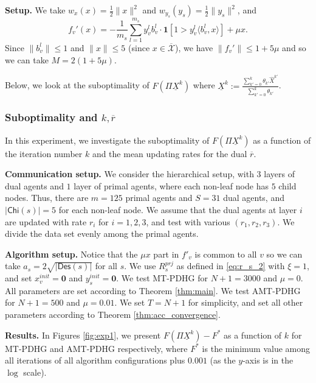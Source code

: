 \documentclass[10pt]{article}
\newcommand{\mc}{\mathcal}
\newcommand{\mb}{\mathbf}
\newcommand{\child}{\mathsf{Chi}}
\newcommand{\Descendant}{\mathsf{Des}}
\begin{document}
\textbf{Setup.} We take $w_x(x) = \frac{1}{2}\|x\|^2$ and $w_{y_s}(y_s) = \frac{1}{2}\|y_s\|^2$, and 
\begin{displaymath}
    f_v'(x) = -\frac{1}{m_s}\sum_{l=1}^{m_s} y_v^lb_v^l \cdot \mb 1[1>y_v^l\langle b_v^l,x\rangle] + \mu x.
\end{displaymath}
Since $\|b_v^l\|\leq 1$ and $\|x\|\leq 5$ (since $x\in \overline{\mc X}$), we have $\|f_v'\|\leq 1 + 5\mu$ and so we can take $M = 2(1 + 5\mu)$.

Below, we look at the suboptimality of $F(\Pi \underline{X}^k)$ where $\underline{X}^k:=\frac{\sum_{k'=0}^k \theta_{k'}\widehat{X}^{k'}}{\sum_{k'=0}^k \theta_{k'}}$. 


\subsubsection{Suboptimality and $k, \overline{r}$}\label{sec:exp1}

In this experiment, we investigate the suboptimality of $F(\Pi \underline{X}^k)$ as a function of the iteration number $k$ and the mean updating rates for the dual $\overline{r}$.


\textbf{Communication setup.} We consider the hierarchical setup, with $3$ layers of dual agents and $1$ layer of primal agents, where each non-leaf node has $5$ child nodes. Thus, there are $m=125$ primal agents and $S = 31$ dual agents, and $|\child(s)|= 5$ for each non-leaf node. We assume that the dual agents at layer $i$ are updated with rate $r_i$ for $i=1,2,3$, and test with various $(r_1,r_2,r_3)$. We divide the data set evenly among the primal agents. 
 

\textbf{Algorithm setup.} 
 Notice that the $\mu x$ part in $f'_v$ is common to all $v$ so we can take $a_s = 2\sqrt{|\Descendant(s)|}$ for all $s$. We use $R_s^{prj}$ as defined in \eqref{eq:r_s_2} with $\xi = 1$, and set $x_v^{init} = \mb 0$ and $y_s^{init} = \mb 0$. We test MT-PDHG for $N+1 = 3000$ and $\mu=0$. All parameters are set according to Theorem \ref{thm:main}. We test AMT-PDHG for $N+1 = 500$ and $\mu=0.01$. We set $T = N+1$ for simplicity, and set all other parameters according to Theorem \ref{thm:acc_convergence}.
 
 


\textbf{Results.} In Figures \ref{fig:exp1}, we present $F(\Pi \underline{X}^k)-F^*$ as a function of $k$ for MT-PDHG and AMT-PDHG respectively, where $F^*$ is the minimum value among all iterations of all algorithm configurations plus $0.001$ (as the $y$-axis is in the $\log$ scale). 
\end{document}
